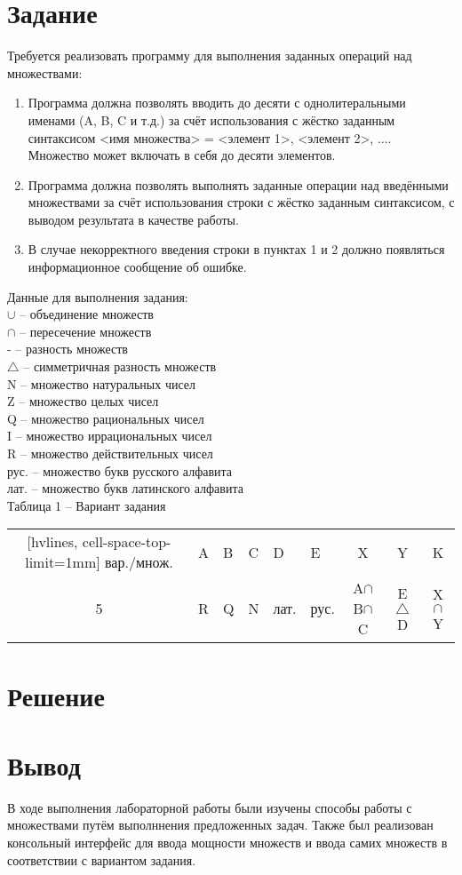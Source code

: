 \documentclass[a4paper,14pt]{extarticle}
\begin{document}
	\section*{Задание}
	Требуется реализовать программу для выполнения заданных операций над множествами:
	\begin{enumerate}
		\item Программа должна позволять вводить до десяти с однолитеральными именами (A, B, C и т.д.) за счёт использования с жёстко заданным синтаксисом <имя множества> = <элемент 1>, <элемент 2>, .... Множество может включать в себя до десяти элементов.
		
		\item Программа должна позволять выполнять заданные операции над введёнными множествами за счёт использования строки с жёстко заданным синтаксисом, с выводом результата в качестве работы.
		
		\item В случае некорректного введения строки в пунктах 1 и 2 должно появляться информационное сообщение об ошибке.
	\end{enumerate}
	
	Данные для выполнения задания:\\
	$\cup$ -- объединение множеств\\
	$\cap$ -- пересечение множеств\\
	- -- разность множеств\\
	$\triangle$ -- симметричная разность множеств\\
	N -- множество натуральных чисел\\
	Z -- множество целых чисел\\
	Q -- множество рациональных чисел\\
	I -- множество иррациональных чисел\\
	R -- множество действительных чисел\\
	рус. -- множество букв русского алфавита\\
	лат. -- множество букв латинского алфавита\\
	
	\noindent Таблица 1 -- Вариант задания\\
	\begin{NiceTabularX}{\textwidth}{cXXXXXccc}[hvlines, cell-space-top-limit=1mm]
		вар./множ. & \centering A & \centering B & \centering C & \centering D & \centering E & X & Y & K \\
		
		5 & \centering R & \centering Q & \centering N & \centering лат. & \centering рус. & A$\cap$B$\cap$C & E$\triangle$D & X$\cap$Y
	\end{NiceTabularX}
	
	\section*{Решение}
	
	\section*{Вывод}
	В ходе выполнения лабораторной работы были изучены способы работы с множествами путём выполннения предложенных задач. Также был реализован консольный интерфейс для ввода мощности множеств и ввода самих множеств в соответствии с вариантом задания.
\end{document}
